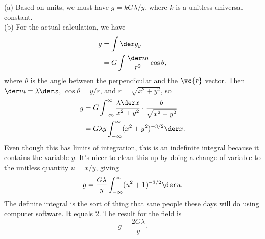 (a) Based on units, we must have $g=kG\lambda/y$, where $k$ is a unitless universal constant.\\
(b) For the actual calculation, we have
\begin{align*}
  g &= \int \der g_y \\
    &= G\int \frac{\der m}{r^2} \cos\theta,
\end{align*}
where $\theta$ is the angle between the perpendicular and the $\vc{r}$ vector.
Then $\der m=\lambda \der x$, $\cos\theta=y/r$, and $r=\sqrt{x^2+y^2}$, so
\begin{align*}
  g &= G\int_{-\infty}^{\infty} \frac{\lambda \der x}{x^2+y^2} \cdot \frac{b}{\sqrt{x^2+y^2}} \\
    &= G\lambda y \int_{-\infty}^{\infty} (x^2+y^2)^{-3/2}\der x.
\end{align*}
Even though this has limits of integration, this is an indefinite integral because it contains the variable $y$.
It's nicer to clean this up by doing a change of variable to the unitless quantity $u=x/y$, giving
\begin{equation*}
  g = \frac{G\lambda}{y} \int_{-\infty}^{\infty} (u^2+1)^{-3/2}\der u.
\end{equation*}
The definite integral is the sort of thing that sane people these days will do using
computer software. It equals 2. The result for the field is
\begin{equation*}
   g = \frac{2G\lambda}{y}.
\end{equation*}
